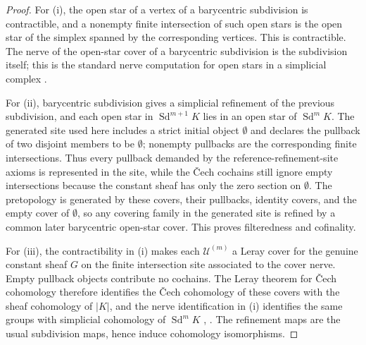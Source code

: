 \begin{proof}
For \textup{(i)}, the open star of a vertex of a barycentric subdivision is contractible, and a nonempty finite intersection of such open stars is the open star of the simplex spanned by the corresponding vertices. This is contractible. The nerve of the open-star cover of a barycentric subdivision is the subdivision itself; this is the standard nerve computation for open stars in a simplicial complex \cite[Secs.~2.1, 4G]{Hatcher2002}.

For \textup{(ii)}, barycentric subdivision gives a simplicial refinement of the previous subdivision, and each open star in $\operatorname{Sd}^{m+1}K$ lies in an open star of $\operatorname{Sd}^{m}K$. The generated site used here includes a strict initial object $\emptyset$ and declares the pullback of two disjoint members to be $\emptyset$; nonempty pullbacks are the corresponding finite intersections. Thus every pullback demanded by the reference-refinement-site axioms is represented in the site, while the \v{C}ech cochains still ignore empty intersections because the constant sheaf has only the zero section on $\emptyset$. The pretopology is generated by these covers, their pullbacks, identity covers, and the empty cover of $\emptyset$, so any covering family in the generated site is refined by a common later barycentric open-star cover. This proves filteredness and cofinality.

For \textup{(iii)}, the contractibility in \textup{(i)} makes each $\mathcal U^{(m)}$ a Leray cover for the genuine constant sheaf $G$ on the finite intersection site associated to the cover nerve. Empty pullback objects contribute no cochains. The Leray theorem for \v{C}ech cohomology therefore identifies the \v{C}ech cohomology of these covers with the sheaf cohomology of $|K|$, and the nerve identification in \textup{(i)} identifies the same groups with simplicial cohomology of $\operatorname{Sd}^mK$ \cite[Chap.~III, Sec.~4]{Bredon1997}, \cite[Sec.~4G]{Hatcher2002}. The refinement maps are the usual subdivision maps, hence induce cohomology isomorphisms.


\end{proof}

